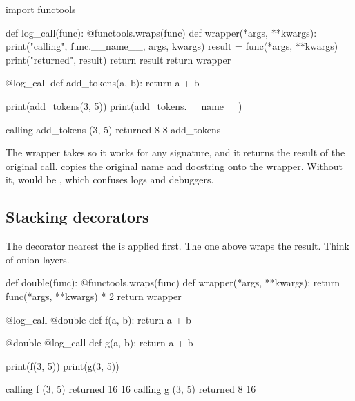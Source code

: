 \begin{pycode}
import functools

def log_call(func):
    @functools.wraps(func)
    def wrapper(*args, **kwargs):
        print("calling", func.__name__, args, kwargs)
        result = func(*args, **kwargs)
        print("returned", result)
        return result
    return wrapper

@log_call
def add_tokens(a, b):
    return a + b

print(add_tokens(3, 5))
print(add_tokens.__name__)
\end{pycode}
\begin{rawcode}
calling add_tokens (3, 5) {}
returned 8
8
add_tokens
\end{rawcode}

The wrapper takes  so it works for any signature, and it returns the
result of the original call.  copies the original name and docstring
onto the wrapper. Without it,  would be , which
confuses logs and debuggers.

\subsection{Stacking decorators}

The decorator nearest the  is applied first. The one above wraps the result.
Think of onion layers.

\begin{center}
\end{center}

\begin{pycode}
def double(func):
    @functools.wraps(func)
    def wrapper(*args, **kwargs):
        return func(*args, **kwargs) * 2
    return wrapper

@log_call
@double
def f(a, b):
    return a + b

@double
@log_call
def g(a, b):
    return a + b

print(f(3, 5))
print(g(3, 5))
\end{pycode}
\begin{rawcode}
calling f (3, 5) {}
returned 16
16
calling g (3, 5) {}
returned 8
16
\end{rawcode}

